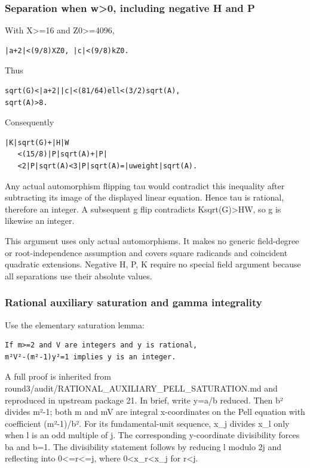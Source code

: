\documentclass[
  10pt,
]{article}
\begin{document}
\subsubsection{Separation when w\textgreater0, including negative H and
P}\label{separation-when-w0-including-negative-h-and-p}

With X\textgreater=16 and Z0\textgreater=4096,

\begin{verbatim}
|a+2|<(9/8)XZ0, |c|<(9/8)kZ0.
\end{verbatim}

Thus

\begin{verbatim}
sqrt(G)<|a+2||c|<(81/64)ell<(3/2)sqrt(A),
sqrt(A)>8.
\end{verbatim}

Consequently

\begin{verbatim}
|K|sqrt(G)+|H|W
   <(15/8)|P|sqrt(A)+|P|
   <2|P|sqrt(A)<3|P|sqrt(A)=|uweight|sqrt(A).
\end{verbatim}

Any actual automorphism flipping tau would contradict this inequality
after subtracting its image of the displayed linear equation. Hence tau
is rational, therefore an integer. A subsequent g flip contradicts
\textbar K\textbar sqrt(G)\textgreater\textbar H\textbar W, so g is
likewise an integer.

This argument uses only actual automorphisms. It makes no generic
field-degree or root-independence assumption and covers square radicands
and coincident quadratic extensions. Negative H, P, K require no special
field argument because all separations use their absolute values.

\subsubsection{Rational auxiliary saturation and gamma
integrality}\label{rational-auxiliary-saturation-and-gamma-integrality}

Use the elementary saturation lemma:

\begin{verbatim}
If m>=2 and V are integers and y is rational,
m²V²-(m²-1)y²=1 implies y is an integer.
\end{verbatim}

A full proof is inherited from
round3/audit/RATIONAL\_AUXILIARY\_PELL\_SATURATION.md and reproduced in
upstream package 21. In brief, write y=a/b reduced. Then b² divides
m²-1; both m and m\textbar V\textbar{} are integral x-coordinates on the
Pell equation with coefficient (m²-1)/b². For its fundamental-unit
sequence, x\_j divides x\_l only when l is an odd multiple of j. The
corresponding y-coordinate divisibility forces b\textbar a and b=1. The
divisibility statement follows by reducing l modulo 2j and reflecting
into 0\textless=r\textless=j, where 0\textless x\_r\textless x\_j for
r\textless j.
\end{document}
